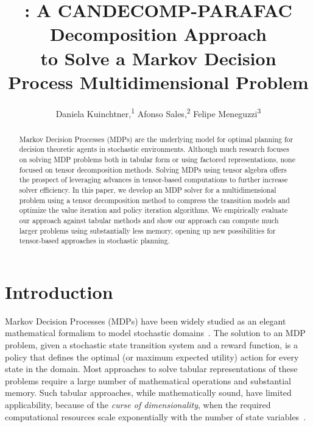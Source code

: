\documentclass[letterpaper]{article} %
\title{\cpmdp{}: A CANDECOMP-PARAFAC Decomposition Approach \\to Solve a Markov Decision Process Multidimensional Problem}
\author{
    Daniela Kuinchtner,\textsuperscript{\rm 1}
    Afonso Sales,\textsuperscript{\rm 2}
    Felipe Meneguzzi\textsuperscript{\rm 3} 
    \\
}
\begin{document}
\maketitle

\begin{abstract}
Markov Decision Processes (MDPs) are the underlying model for optimal planning for decision theoretic agents in stochastic environments.
Although much research focuses on solving MDP problems both in tabular form or using factored representations, none focused on tensor decomposition methods. 
Solving MDPs using tensor algebra offers the prospect of leveraging advances in tensor-based computations to further increase solver efficiency. 
In this paper, we develop an MDP solver for a multidimensional problem using a tensor decomposition method to compress the transition models and optimize the value iteration and policy iteration algorithms. 
We empirically evaluate our approach against tabular methods and show our approach can compute much larger problems using substantially less memory, opening up new possibilities for tensor-based approaches in stochastic planning. 
\end{abstract}


\section{Introduction}

\noindent Markov Decision Processes (MDPs) have been widely studied as an elegant mathematical formalism to model stochastic domains~\cite{bellman_MDP_1957}. 
The solution to an MDP problem, given a stochastic state transition system and a reward function, is a policy that defines the optimal (or maximum expected utility) action for every state in the domain. 
Most approaches to solve tabular representations of these problems require a large number of mathematical operations and substantial memory. 
Such tabular approaches, while mathematically sound, have limited applicability, because of the \emph{curse of dimensionality}, when the required computational resources scale exponentially with the number of state variables~\cite{book-dynamic-programming-bellman}. 
\end{document}

